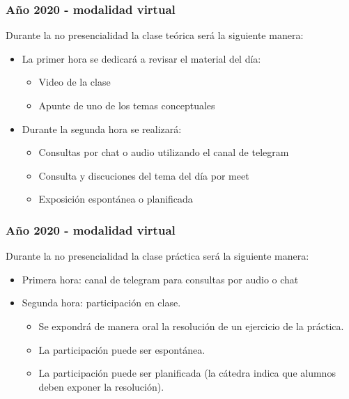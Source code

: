 \documentclass[aspectratio=169,compress]{beamer}
\begin{document}
\begin{frame}[fragile]
  \frametitle{Año 2020 - modalidad virtual}
  Durante la no presencialidad la clase teórica será la siguiente manera:

\bigskip
\begin{itemize}
\item La primer hora se dedicará a revisar el material del día:
\begin{itemize}
\item Video de la clase
\item Apunte de uno de los temas conceptuales
\end{itemize}
\end{itemize}

\bigskip

\begin{itemize}
\item Durante la segunda hora se realizará:
\begin{itemize}
\item Consultas por chat o audio utilizando el canal de telegram
\item Consulta y discuciones del tema del día por meet
\item Exposición espontánea o planificada
\end{itemize}
\end{itemize}

\end{frame}

\begin{frame}[fragile]
  \frametitle{Año 2020 - modalidad virtual}
  Durante la no presencialidad la clase práctica será la siguiente manera:

\bigskip
\begin{itemize}
\item Primera hora: canal de telegram para consultas por audio o chat
\bigskip
\item Segunda hora: participación en clase.
\begin{itemize}
\item Se expondrá de manera oral la resolución de un ejercicio de la práctica.
\item La participación puede ser espontánea.
\item La participación puede ser planificada (la cátedra indica que alumnos deben exponer la resolución).
\end{itemize}
\end{itemize}

\end{frame}
\end{document}

